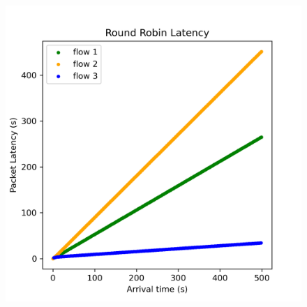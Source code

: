 \documentclass[compress]{beamer}
\begin{document}
\begin{frame}
\begin{columns}
\begin{column}{0.5\textwidth}
\begin{figure}
                    \includegraphics[width=\textwidth]{../img/rr_latency}
                \end{figure}
            \end{column}
        \end{columns}
    \end{frame}
\end{document}
